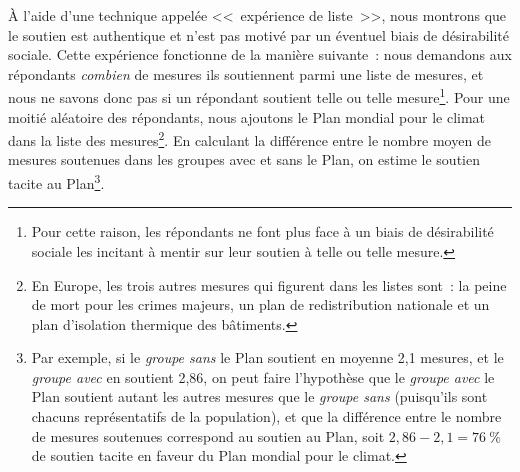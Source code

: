 \documentclass[a5paper,french]{memoir}
\begin{document}
À l'aide d'une technique appelée <<~expérience de liste~>>, nous montrons que le soutien est authentique et n'est pas motivé par un éventuel biais de désirabilité sociale. Cette expérience fonctionne de la manière suivante~: nous demandons aux répondants \textit{combien} de mesures ils soutiennent parmi une liste de mesures, et nous ne savons donc pas si un répondant soutient telle ou telle mesure\footnote{Pour cette raison, les répondants ne font plus face à un biais de désirabilité sociale les incitant à mentir sur leur soutien à telle ou telle mesure.}. 
Pour une moitié aléatoire des répondants, nous ajoutons le Plan mondial pour le climat dans la liste des mesures\footnote{En Europe, les trois autres mesures qui figurent dans les listes sont~: la peine de mort pour les crimes majeurs, un plan de redistribution nationale et un plan d'isolation thermique des bâtiments.}. 
En calculant la différence entre le nombre moyen de mesures soutenues dans les groupes avec et sans le Plan, on estime le soutien tacite au Plan\footnote{Par exemple, si le \textit{groupe sans} le Plan soutient en moyenne 2,1 mesures, et le \textit{groupe avec} en soutient 2,86, on peut faire l'hypothèse que le \textit{groupe avec} le Plan soutient autant les autres mesures que le \textit{groupe sans} (puisqu'ils sont chacuns représentatifs de la population), et que la différence entre le nombre de mesures soutenues correspond au soutien au Plan, soit $2,86 - 2,1 = 76~\%$ de soutien tacite en faveur du Plan mondial pour le climat.}. 
\end{document}
